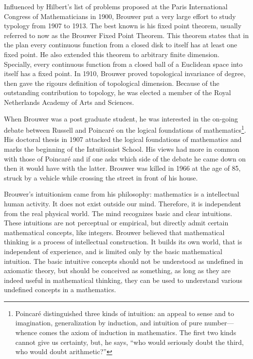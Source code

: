 \documentclass[b5paper]{article}
\begin{document}
Influenced by Hilbert's list of problems proposed at the Paris International Congress of Mathematicians in 1900, Brouwer put a very large effort to study typology from 1907 to 1913. The best known is his fixed point theorem, usually referred to now as the Brouwer Fixed Point Theorem. This theorem states that in the plan every continuous function from a closed disk to itself has at least one fixed point. He also extended this theorem to arbitrary finite dimension. Specially, every continuous function from a closed ball of a Euclidean space into itself has a fixed point. In 1910, Brouwer proved topological invariance of degree, then gave the rigours definition of topological dimension. Because of the outstanding contribution to topology, he was elected a member of the Royal Netherlands Academy of Arts and Sciences.

When Brouwer was a post graduate student, he was interested in the on-going debate between Russell and Poincaré on the logical foundations of mathematics\footnote{Poincaré distinguished three kinds of intuition: an appeal to sense and to imagination, generalization by induction, and intuition of pure number—whence comes the axiom of induction in mathematics. The first two kinds cannot give us certainty, but, he says, ``who would seriously doubt the third, who would doubt arithmetic?''\cite{Poincare2}}. His doctoral thesis in 1907 attacked the logical foundations of mathematics and marks the beginning of the Intuitionist School. His views had more in common with those of Poincaré and if one asks which side of the debate he came down on then it would have with the latter. Brouwer was killed in 1966 at the age of 85, struck by a vehicle while crossing the street in front of his house.

Brouwer's intuitionism came from his philosophy: mathematics is a intellectual human activity. It does not exist outside our mind. Therefore, it is independent from the real physical world. The mind recognizes basic and clear intuitions. These intuitions are not perceptual or empirical, but directly admit certain mathematical concepts, like integers. Brouwer believed that mathematical thinking is a process of intellectual construction. It builds its own world, that is independent of experience, and is limited only by the basic mathematical intuition. The basic intuitive concepts should not be understood as undefined in axiomatic theory, but should be conceived as something, as long as they are indeed useful in mathematical thinking, they can be used to understand various undefined concepts in a mathematics.
\end{document}
